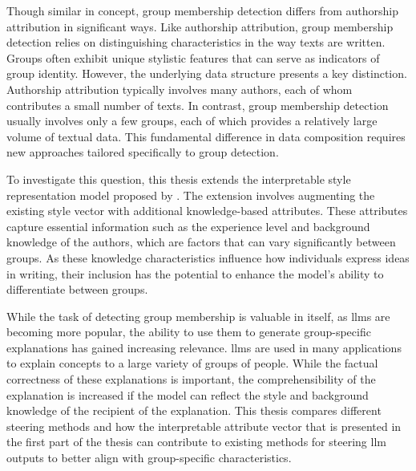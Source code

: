 Though similar in concept, group membership detection differs from authorship attribution in significant ways. Like authorship attribution, group membership detection relies on distinguishing characteristics in the way texts are written. Groups often exhibit unique stylistic features that can serve as indicators of group identity. However, the underlying data structure presents a key distinction. Authorship attribution typically involves many authors, each of whom contributes a small number of texts. In contrast, group membership detection usually involves only a few groups, each of which provides a relatively large volume of textual data. This fundamental difference in data composition requires new approaches tailored specifically to group detection.


To investigate this question, this thesis extends the interpretable style representation model proposed by \citet{patelLearningInterpretableStyle2023}. The extension involves augmenting the existing style vector with additional knowledge-based attributes. These attributes capture essential information such as the experience level and background knowledge of the authors, which are factors that can vary significantly between groups. As these knowledge characteristics influence how individuals express ideas in writing, their inclusion has the potential to enhance the model's ability to differentiate between groups.


While the task of detecting group membership is valuable in itself, as \aclp{llm} are becoming more popular, the ability to use them to generate group-specific explanations has gained increasing relevance. \acp{llm} are used in many applications to explain concepts to a large variety of groups of people. While the factual correctness of these explanations is important, the comprehensibility of the explanation is increased if the model can reflect the style and background knowledge of the recipient of the explanation. This thesis compares different steering methods and how the interpretable attribute vector that is presented in the first part of the thesis can contribute to existing methods for steering \ac{llm} outputs to better align with group-specific characteristics.

